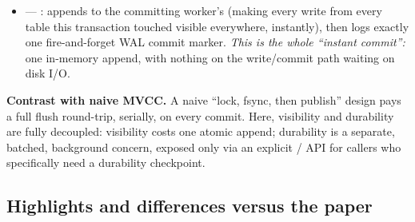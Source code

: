 \documentclass[11pt]{article}
\begin{document}
\begin{itemize}
         marker (commit-gated replay), and replays sorted by
        , not by , since commit order can
        differ from log order across concurrent workers.
  \item {} --- : appends to the
        committing worker's  (making every write from every table this
        transaction touched visible everywhere, instantly), then logs exactly one
        fire-and-forget WAL commit marker. \emph{This is the whole ``instant commit'':}
        one in-memory append, with nothing on the write/commit path waiting on disk I/O.
\end{itemize}

\textbf{Contrast with naive MVCC.} A naive ``lock, fsync, then publish'' design pays a
full flush round-trip, serially, on every commit. Here, visibility and durability are
fully decoupled: visibility costs one atomic append; durability is a separate, batched,
background concern, exposed only via an explicit
/ API for callers who
specifically need a durability checkpoint.

\subsection{Highlights and differences versus the paper}
\end{document}
